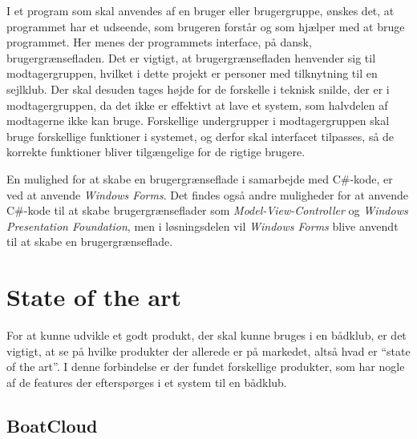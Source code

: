 I et program som skal anvendes af en bruger eller brugergruppe, ønskes det, at programmet har et udseende, som
brugeren forstår og som hjælper med at bruge programmet. Her menes der programmets interface, på dansk,
brugergrænsefladen. Det er vigtigt, at brugergrænsefladen henvender sig til modtagergruppen, hvilket i dette
projekt er personer med tilknytning til en sejlklub. Der skal desuden tages højde for de forskelle i teknisk
snilde, der er i modtagergruppen, da det ikke er effektivt at lave et system, som halvdelen af modtagerne ikke
kan bruge. Forskellige undergrupper i modtagergruppen skal bruge forskellige funktioner i systemet, og derfor
skal interfacet tilpasses, så de korrekte funktioner bliver tilgængelige for de rigtige brugere.

En mulighed for at skabe en brugergrænseflade i samarbejde med C\#-kode, er ved at anvende \textit{Windows
Forms}. Det findes også andre muligheder for at anvende C\#-kode til at skabe brugergrænseflader som
\textit{Model-View-Controller} og \textit{Windows Presentation Foundation}, men i løsningsdelen vil
\textit{Windows Forms} blive anvendt til at skabe en brugergrænseflade. 



\section{State of the art}

For at kunne udvikle et godt produkt, der skal kunne bruges i en bådklub, er det vigtigt, at se på hvilke
produkter der allerede er på markedet, altså hvad er ``state of the art''. I denne forbindelse er der fundet
forskellige produkter, som har nogle af de features der efterspørges i et system til en bådklub.



\subsection*{BoatCloud}

